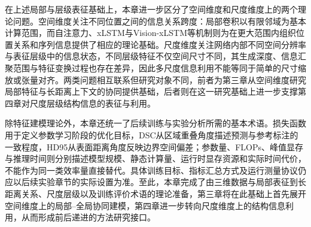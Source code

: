 在上述局部与层级表征基础上，本章进一步区分了空间维度和尺度维度上的两个理论问题。空间维度关注不同位置之间的信息关系跨度：局部卷积以有限邻域为基本计算范围，而自注意力、xLSTM与Vision-xLSTM等机制则为在更大范围内组织位置关系和序列信息提供了相应的理论基础。尺度维度关注网络内部不同空间分辨率与表征层级中的信息状态，不同层级特征不仅空间尺寸不同，其生成深度、信息汇聚范围与特征变换过程也存在差异，因此多尺度信息利用不能等同于简单的尺寸缩放或张量对齐。两类问题相互联系但研究对象不同，前者为第三章从空间维度研究局部特征与长距离上下文的协同提供基础，后者则在这一研究基础上进一步支撑第四章对尺度层级结构信息的表征与利用。

除特征建模理论外，本章还统一了后续训练与实验分析所需的基本术语。损失函数用于定义参数学习阶段的优化目标，DSC从区域重叠角度描述预测与参考标注的一致程度，HD95从表面距离角度反映边界空间偏差；参数量、FLOPs、峰值显存与推理时间则分别描述模型规模、静态计算量、运行时显存资源和实际时间代价，不能作为同一类效率量直接替代。具体训练目标、指标汇总方式及运行测量协议仍应以后续实验章节的实际设置为准。至此，本章完成了由三维数据与局部表征到长距离关系、尺度层级以及训练评价术语的理论准备，第三章将在此基础上首先展开空间维度上的局部--全局协同建模，第四章进一步转向尺度维度上的结构信息利用，从而形成前后递进的方法研究接口。
